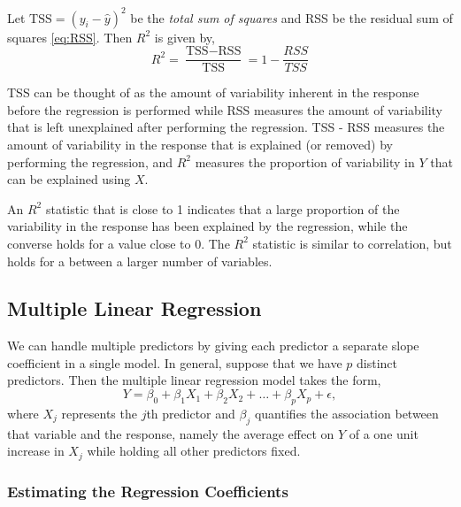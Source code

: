 \documentclass{article}
\numberwithin{equation}{section}
\begin{document}
Let $\text{TSS} = (y_i - \hat y)^2$ be the \textit{total sum of squares} and RSS be the residual sum of squares \eqref{eq:RSS}. Then $R^2$ is given by,
\begin{equation}
    R^2 =  \frac{\text{TSS} - \text{RSS}}{\text{TSS}} = 1 - \frac{RSS}{TSS}
\end{equation}

TSS can be thought of as the amount of variability inherent in the response before the regression is performed while RSS measures the amount of variability that is left unexplained after performing the regression. TSS - RSS measures the amount of variability in the response that is explained (or
removed) by performing the regression, and $R^2$ measures the proportion of variability in $Y$ that can be explained using $X$.

An $R^2$ statistic that is close to 1 indicates that a large proportion of the variability in the response has been explained by the regression, while the converse holds for a value close to 0. The $R^2$ statistic is similar to correlation, but holds for a between a larger number of variables.

\subsection{Multiple Linear Regression}
We can handle multiple predictors by giving each predictor a separate slope coefficient in a single model. In general, suppose that we have $p$ distinct predictors. Then the multiple linear regression model takes the form,
\begin{equation}
    Y = \beta_0 + \beta_1 X_1 + \beta_2 X_2 + \dots + \beta_p X_p + \epsilon,
\end{equation}
where $X_j$ represents the $j$th predictor and $\beta_j$ quantifies the association between that variable and the response, namely the average effect on $Y$ of a one unit increase in $X_j$  while holding all other predictors fixed.

\subsubsection{Estimating the Regression Coefficients}
\end{document}
